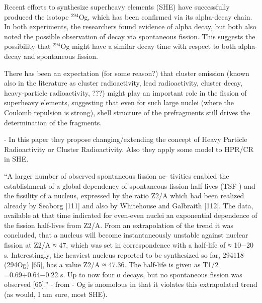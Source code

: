 
Recent efforts to synthesize superheavy elements (SHE) have successfully produced the isotope $^{294}$Og, which has been confirmed via its alpha-decay chain. In both experiments, the researchers found evidence of alpha decay, but both also noted the possible observation of decay via spontaneous fission. This suggests the possibility that $^{294}$Og might have a similar decay time with respect to both alpha-decay and spontaneous fission.

There has been an expectation (for some reason?) that cluster emission (known also in the literature as cluster radioactivity, lead radioactivity, cluster decay, heavy-particle radioactivity, ???) might play an important role in the fission of superheavy elements, suggesting that even for such large nuclei (where the Coulomb repulsion is strong), shell structure of the prefragments still drives the determination of the fragments.

\cite{Poenaru2011, Poenaru2012} - In this paper they propose changing/extending the concept of Heavy Particle Radioactivity or Cluster Radioactivity. Also they apply some model to HPR/CR in SHE.

``A larger number of observed spontaneous fission ac- tivities enabled the establishment of a global dependency of spontaneous fission half-lives (TSF ) and the fissility of a nucleus, expressed by the ratio Z2/A which had been realized already by Seaborg [111] and also by Whitehouse and Galbraith [112]. The data, available at that time indicated for even-even nuclei an exponential dependence of the fission half-lives from Z2/A. From an extrapolation of the trend it was concluded, that a nucleus will become instantaneously unstable against nuclear fission at Z2/A ≈ 47, which was set in correspondence with a half-life of ≈ 10−20 s. Interestingly, the heaviest nucleus reported to be synthesized so far, 294118 (294Og) [65], has a value Z2/A ≈ 47.36. The half-life is given as T1/2 =0.69+0.64−0.22 s. Up to now four α decays, but no spontaneous fission was observed [65].'' - from \cite{Heßberger2017} - Og is anomolous in that it violates this extrapolated trend (as would, I am sure, most SHE).

